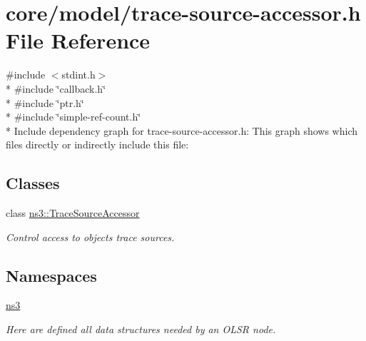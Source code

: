 \hypertarget{trace-source-accessor_8h}{}\section{core/model/trace-\/source-\/accessor.h File Reference}
\label{trace-source-accessor_8h}
{\ttfamily \#include $<$stdint.\+h$>$}\\*
{\ttfamily \#include \char`\"{}callback.\+h\char`\"{}}\\*
{\ttfamily \#include \char`\"{}ptr.\+h\char`\"{}}\\*
{\ttfamily \#include \char`\"{}simple-\/ref-\/count.\+h\char`\"{}}\\*
Include dependency graph for trace-\/source-\/accessor.h\+:
This graph shows which files directly or indirectly include this file\+:
\subsection*{Classes}
\begin{DoxyCompactItemize}
\item 
class \hyperlink{classns3_1_1TraceSourceAccessor}{ns3\+::\+Trace\+Source\+Accessor}
\begin{DoxyCompactList}\small\item\em Control access to objects\textquotesingle{} trace sources. \end{DoxyCompactList}\end{DoxyCompactItemize}
\subsection*{Namespaces}
\begin{DoxyCompactItemize}
\item 
 \hyperlink{namespacens3}{ns3}
\begin{DoxyCompactList}\small\item\em Here are defined all data structures needed by an O\+L\+SR node. \end{DoxyCompactList}\end{DoxyCompactItemize}
